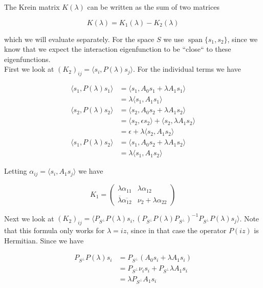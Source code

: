 \documentclass[12pt]{article}
\DeclareMathOperator{\spn}{span}
\begin{document}
The Krein matrix $K(\lambda)$ can be written as the sum of two matrices

\[
K(\lambda) = K_1(\lambda) - K_2(\lambda)
\]

which we will evaluate separately. For the space $S$ we use $\spn \{ s_1, s_2\}$, since we know that we expect the interaction eigenfunction to be ``close`` to these eigenfunctions.\\

First we look at $(K_2)_{ij} = \langle s_i, P(\lambda) s_j \rangle$. For the individual terms we have

\begin{align*}
\langle s_1, P(\lambda) s_1 \rangle &= \langle s_1, A_0 s_1 + \lambda A_1 s_1 \rangle \\
&= \lambda \langle s_1, A_1 s_1 \rangle\\
\langle s_2, P(\lambda) s_2 \rangle &= \langle s_2, A_0 s_2 + \lambda A_1 s_2 \rangle \\
&= \langle s_2, \epsilon s_2 \rangle + \langle s_2, \lambda A_1 s_2 \rangle \\
&= \epsilon + \lambda \langle s_2, A_1 s_2 \rangle \\
\langle s_1, P(\lambda) s_2 \rangle &= \langle s_1, A_0 s_2 + \lambda A_1 s_2 \rangle \\
&= \lambda \langle s_1, A_1 s_2 \rangle
\end{align*}

Letting $\alpha_{ij} = \langle s_i, A_1 s_j \rangle$ we have

\[
K_1 = \begin{pmatrix}
\lambda \alpha_{11} & \lambda \alpha_{12} \\
\overline{\lambda} \overline{\alpha_{12}} & \nu_2 + \lambda \alpha_{22}
\end{pmatrix}
\]

Next we look at $(K_2)_{ij} = \langle P_{S^\perp} P(\lambda) s_i, ( P_{S^\perp} P(\lambda) P_{S^\perp})^{-1} P_{S^\perp} P(\lambda) s_j \rangle$. Note that this formula only works for $\lambda = i z$, since in that case the operator $P(i z)$ is Hermitian. Since we have

\begin{align*}
P_{S^\perp} P(\lambda) s_i &= P_{S^\perp} (A_0 s_i + \lambda A_1 s_i) \\
&= P_{S^\perp} \nu_i s_i + P_{S^\perp} \lambda A_1 s_i \\
&= \lambda P_{S^\perp} A_1 s_i 
\end{align*}
\end{document}
